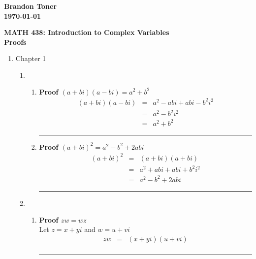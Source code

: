 \documentclass{article}%
\newenvironment{proof}[1][]{\begin{samepage}\textbf{Proof #1} }{\rule{0.5em}{0.5em} \end{samepage}}
\begin{document}
\begin{flushright}
\textbf{Brandon Toner \\
\today}
\end{flushright}

\begin{center}
\textbf{MATH 438: Introduction to Complex Variables \\
Proofs} \\
\end{center}

\begin{enumerate}
    \item Chapter 1
    \begin{enumerate}[label*=\arabic*.]
        \item %
        \begin{enumerate}[label=\alph*.]
            \item 
            \begin{proof}[$(a+bi)(a-bi)=a^2 + b^2$]
                \begin{eqnarray*}
                    (a+bi)(a-bi)&=& a^2 - abi + abi - b^2i^2 \\
                                &=& a^2 - b^2 i^2            \\
                                &=& a^2 + b^2
                \end{eqnarray*}
            \end{proof}
            \item
            \begin{proof}[$(a+bi)^2=a^2 - b^2 + 2abi$]
                \begin{eqnarray*}
                    (a+bi)^2 &=& (a+bi)(a+bi)              \\
                             &=& a^2 + abi + abi + b^2 i^2 \\
                             &=& a^2 - b^2 + 2abi
                \end{eqnarray*}
            \end{proof}
        \end{enumerate}
        \item
    	\begin{enumerate}[label=\alph*]
            \item
            \begin{proof}[$zw=wz$]
                \\ Let $z=x+yi$ and $w=u+vi$
                \begin{eqnarray*}
                    zw&=&(x+yi)(u+vi) \\

\end{eqnarray*}
\end{proof}
\end{enumerate}
\end{enumerate}
\end{enumerate}
\end{document}
